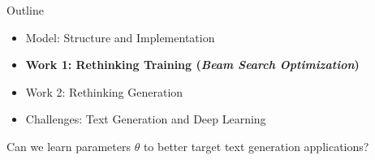 \begin{frame}{Outline}

  \begin{itemize}
  \item Model: Structure and Implementation
    \air
  \item \textbf{Work 1: Rethinking Training (\textit{Beam Search Optimization})}
    \air

  \item Work 2: Rethinking Generation
    \air

  \item Challenges: Text Generation and Deep Learning
  \end{itemize}

  \begin{center}
    Can we learn parameters $\theta$ to better target text generation
    applications?
  \end{center}


\end{frame}









    

